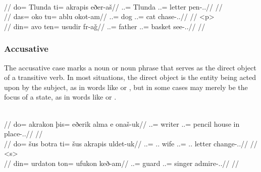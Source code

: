 	\begingl
		\glpreamble{}\\
		//
		\gla do= Tlunda ti= akrapis eðer-aš//
		\glb \An.\Sg.\Erg= Tlunda \In.\Sg.\Acc= letter pen-\Ind.\Npst.\Rtsp//
		\glft{}//
	\endgl
	\a<a2>\begingl
		\glpreamble{}\\
		//
		\gla das= oko tu= ablu okot-am//
		\glb \An.\Pc.\Erg= dog \An.\Sg.\Acc= cat chase-\Ind.\Pst.\Ipfv//
		\glft{}//
	\endgl
	\begingl
		\glpreamble{}\\
		//
		\gla din= avo ten= usudir fr-aǧ//
		\glb \An.\Pl.\Erg= father \In.\Pl.\Acc= basket see-\Ind.\Pst.\Rtsp//
		\glft{}//
	\endgl
\xe

\subsubsection{Accusative}
\label{subsubsec:tvk-nouns-accusative}

The accusative case marks a noun or noun phrase that serves as the direct object of a transitive verb. In most situations, the direct object is the entity being acted upon by the subject, as in words like   or  , but in some cases may merely be the focus of a state, as in words like   or  .

	\begingl
		\glpreamble{}\\
		//
		\gla do= akrakon þis= eðerik alma e onaš-uk//
		\glb \An.\Sg.\Erg= writer \In.\Pc.\Acc= pencil house in place-\Ind.\Pst.\Pfv//
		\glft{}//
	\endgl
	\a<a2>\begingl
		\glpreamble{}\\
		//
		\gla do= šus botra ti= šus akrapis uldet-uk//
		\glb \An.\Sg.\Erg= \Tpp.\An.\Gen{} wife \In.\Sg.\Acc= \Tpp.\An.\Gen{} letter change-\Ind.\Pst.\Pfv//
		\glft{}//
	\endgl
	\begingl
		\glpreamble{}\\
		//
		\gla din= urdaton ton= ufukon keð-am//
		\glb \An.\Pl.\Erg= guard \An.\Pl.\Acc= singer admire-\Ind.\Pst.\Ipfv//
		\glft{}//
	\endgl
\xe

